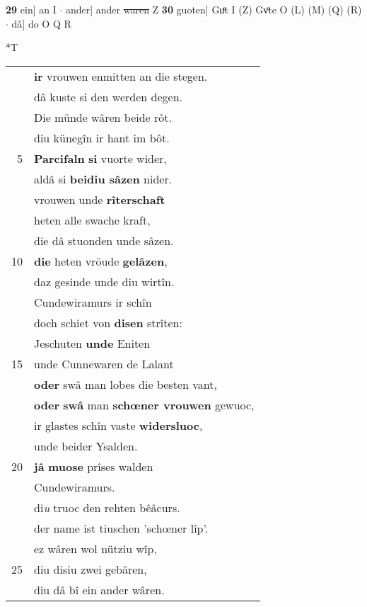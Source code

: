 \documentclass[8pt,a4paper,notitlepage]{article}
\begin{document}
\begin{table}[ht]
\begin{minipage}[t]{0.5\linewidth}
\textbf{29} ein] an I  $\cdot$ ander] ander \sout{waren} Z \textbf{30} guoten] Guͤt I (Z) Gvͦte O (L) (M) (Q) (R)  $\cdot$ dâ] do O Q R \newline
\end{minipage}
\hspace{0.5cm}
\begin{minipage}[t]{0.5\linewidth}
\small
\begin{center}*T
\end{center}
\begin{tabular}{rl}
 & \textbf{ir} vrouwen enmitten an die stegen.\\ 
 & dâ kuste si den werden degen.\\ 
 & Die münde wâren beide rôt.\\ 
 & diu künegîn ir hant im bôt.\\ 
5 & \textbf{Parcifaln} \textbf{si} vuorte wider,\\ 
 & aldâ si \textbf{beidiu sâzen} nider.\\ 
 & vrouwen unde \textbf{rîterschaft}\\ 
 & heten alle swache kraft,\\ 
 & die dâ stuonden unde sâzen.\\ 
10 & \textbf{die} heten vröude \textbf{gelâzen},\\ 
 & daz gesinde unde diu wirtîn.\\ 
 & Cundewiramurs ir schîn\\ 
 & doch schiet von \textbf{disen} strîten:\\ 
 & Jeschuten \textbf{unde} Eniten\\ 
15 & unde Cunnewaren de Lalant\\ 
 & \textbf{oder} swâ man lobes die besten vant,\\ 
 & \textbf{oder} \textbf{swâ} man \textbf{schœner vrouwen} gewuoc,\\ 
 & ir glastes schîn vaste \textbf{widersluoc},\\ 
 & unde beider Ysalden.\\ 
20 & \textbf{jâ} \textbf{muose} prîses walden\\ 
 & Cundewiramurs.\\ 
 & di\textit{u} truoc den rehten bêâcurs.\\ 
 & der name ist tiuschen 'schœner lîp'.\\ 
 & ez wâren wol nütziu wîp,\\ 
25 & diu disiu zwei gebâren,\\ 
 & diu dâ bî ein ander wâren.\\ 

\end{tabular}
\end{minipage}
\end{table}
\end{document}
